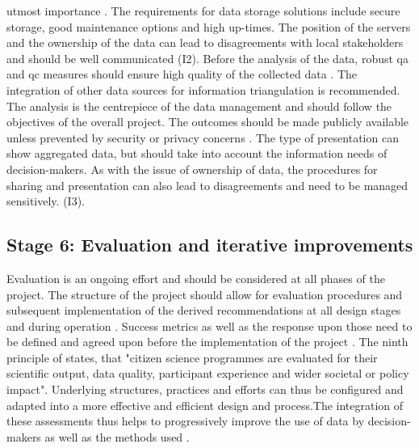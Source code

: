 utmost importance \autocite{gualazziniEWEAEarlyWarning2021,ifrcCommunityBasedSurveillanceGuiding2017}. The requirements for data storage solutions include secure storage, good maintenance options and high up-times. The position of the servers and the ownership of the data can lead to disagreements with local stakeholders and should be well communicated (I2). Before the analysis of the data, robust \acrshort{qa} and \acrshort{qc} measures should ensure high quality of the collected data \autocite{fraislCitizenScienceEnvironmental2022,sharpeCommunityBasedEcological2006}. The integration of other data sources for information triangulation is recommended. The analysis is the centrepiece of the data management and should follow the objectives of the overall project. The outcomes should be made publicly available unless prevented by security or privacy concerns \autocite{escaeuropeancitizenscienceassociationTenPrinciplesCitizen2015,sharpeCommunityBasedEcological2006}. The type of presentation can show aggregated data, but should take into account the information needs of decision-makers. As with the issue of ownership of data, the procedures for sharing and presentation can also lead to disagreements and need to be  managed sensitively. (I3)\autocite{ifrcCommunityBasedSurveillanceGuiding2017}. %

\subsection{Stage 6: Evaluation and iterative improvements}

Evaluation is an ongoing effort and should be considered at all phases of the project. The structure of the project should allow for evaluation procedures and subsequent implementation of the derived recommendations at all design stages and during operation \autocite{fraislCitizenScienceEnvironmental2022,ifrcCommunityBasedSurveillanceGuiding2017}. Success metrics as well as the response upon those need to be defined and agreed upon before the implementation of the project \autocite{fraislCitizenScienceEnvironmental2022,gualazziniEWEAEarlyWarning2021}. The ninth principle of \autocite{escaeuropeancitizenscienceassociationTenPrinciplesCitizen2015} states, that "citizen science programmes are evaluated for their scientific output, data quality, participant experience and wider societal or policy impact". Underlying structures, practices and efforts can thus be configured and adapted into a more effective and efficient design and process.The integration of these assessments thus helps to progressively improve the use of data by decision-makers as well as the methods used \autocite{fraislCitizenScienceEnvironmental2022}.


